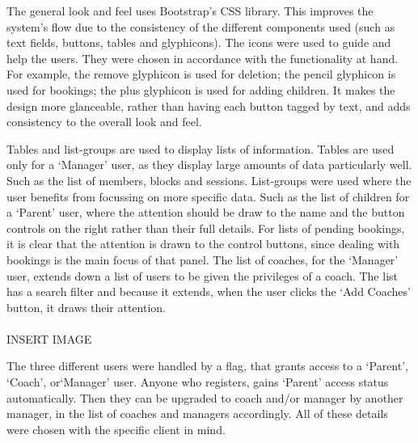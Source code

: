 \documentclass{l3proj}
\begin{document}
\par The general look and feel uses Bootstrap's CSS library. This improves the system's flow due to the consistency of the different components used (such as text fields, buttons, tables and glyphicons). The icons were used to guide and help the users. They were chosen in accordance with the functionality at hand. For example, the remove glyphicon is used for deletion; the pencil glyphicon is used for bookings; the plus glyphicon is used for adding children. It makes the design more glanceable, rather than having each button tagged by text, and adds consistency to the overall look and feel.\\
\par Tables and list-groups are used to display lists of information. Tables are used only for a `Manager' user, as they display large amounts of data particularly well. Such as the list of members, blocks and sessions. List-groups were used where the user benefits from focussing on more specific data. Such as the list of children for a `Parent' user, where the attention should be draw to the name and the button controls on the right rather than their full details. For lists of pending bookings, it is clear that the attention is drawn to the control buttons, since dealing with bookings is the main focus of that panel. The list of coaches, for the `Manager' user, extends down a list of users to be given the privileges of a coach. The list has a search filter and because it extends, when the user clicks the `Add Coaches' button, it draws their attention.\\
\\{\LARGE{INSERT IMAGE}}
\par 
The three different users were handled by a flag, that grants access to a `Parent', `Coach', or`Manager' user. Anyone who registers, gains `Parent' access status automatically. Then they can be upgraded to coach and/or manager by another manager, in the list of coaches and managers accordingly. All of these details were chosen with the specific client in mind.\\
\end{document}
